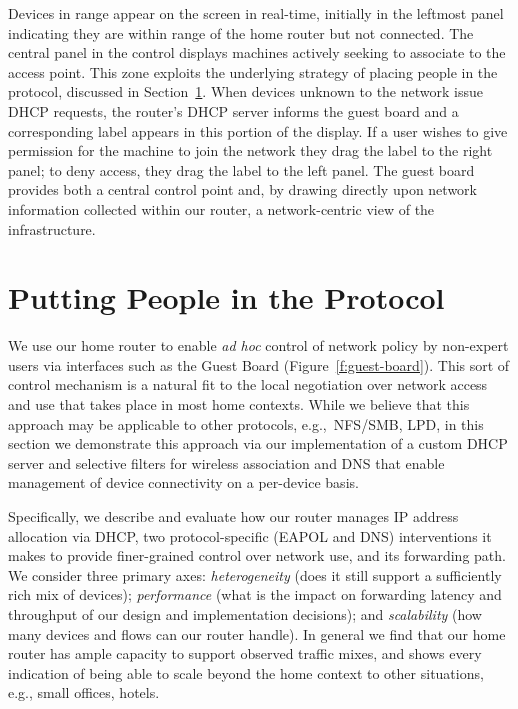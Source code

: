 Devices in range appear on the screen in real-time, initially in the leftmost
panel indicating they are within range of the home router but not connected.
The central panel in the control displays machines actively seeking to associate
to the access point. This zone exploits the underlying strategy of placing
people in the protocol, discussed in Section~\ref{s:protocols}.  When devices
unknown to the network issue DHCP requests, the router's DHCP server informs the
guest board and a corresponding label appears in this portion of the display.
If a user wishes to give permission for the machine to join the network they
drag the label to the right panel; to deny access, they drag the label to the
left panel. The guest board provides both a central control point and, by
drawing directly upon network information collected within our router, a
network-centric view of the infrastructure. 

\section{Putting People in the Protocol} \label{s:protocols}

We use our home router to enable \emph{ad hoc} control of network policy by
non-expert users via interfaces such as the Guest Board
(Figure~\ref{f:guest-board}).  This sort of control mechanism is a natural fit
to the local negotiation over network access and use that takes place in most
home contexts.  While we believe that this approach may be applicable to other
protocols, e.g.,~NFS/SMB, LPD, in this section we demonstrate this approach via
our implementation of a custom DHCP server and selective filters for wireless
association and DNS that enable management of device connectivity on a
per-device basis. 

Specifically, we describe and evaluate how our router manages IP address
allocation via DHCP, two protocol-specific (EAPOL and DNS) interventions it
makes to provide finer-grained control over network use, and its forwarding
path.  We consider three primary axes: \emph{heterogeneity} (does it still
support a sufficiently rich mix of devices); \emph{performance} (what is the
impact on forwarding latency and throughput of our design and implementation
decisions); and \emph{scalability} (how many devices and flows can our router
handle).  In general we find that our home router has ample capacity to support
observed traffic mixes, and shows every indication of being able to scale beyond
the home context to other situations, e.g., small offices, hotels. 

